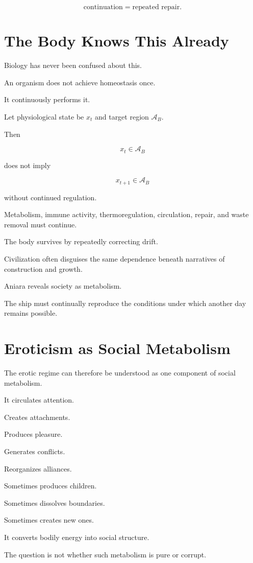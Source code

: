 \documentclass[11pt,oneside]{book}
\theoremstyle{definition}
\theoremstyle{remark}
\newcommand{\A}{\mathcal{A}}
\begin{document}
\[
\text{continuation}
=
\text{repeated repair}.
\]

\section{The Body Knows This Already}

Biology has never been confused about this.

An organism does not achieve homeostasis once.

It continuously performs it.

Let physiological state be \(x_t\) and target region \(\A_B\).

Then

\[
x_t\in\A_B
\]

does not imply

\[
x_{t+1}\in\A_B
\]

without continued regulation.

Metabolism, immune activity, thermoregulation, circulation, repair, and waste removal must continue.

The body survives by repeatedly correcting drift.

Civilization often disguises the same dependence beneath narratives of construction and growth.

Aniara reveals society as metabolism.

The ship must continually reproduce the conditions under which another day remains possible.

\section{Eroticism as Social Metabolism}

The erotic regime can therefore be understood as one component of social metabolism.

It circulates attention.

Creates attachments.

Produces pleasure.

Generates conflicts.

Reorganizes alliances.

Sometimes produces children.

Sometimes dissolves boundaries.

Sometimes creates new ones.

It converts bodily energy into social structure.

The question is not whether such metabolism is pure or corrupt.
\end{document}

